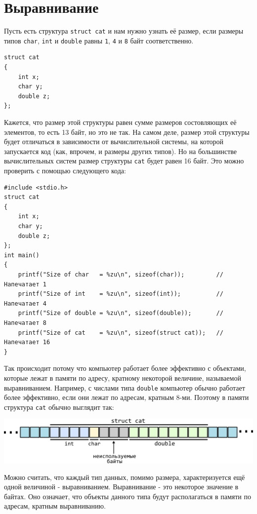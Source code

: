 \documentclass[10pt]{article}
\begin{document}
\newpage
\section*{Выравнивание}
Пусть есть структура \texttt{struct cat} и нам нужно узнать её размер, если размеры типов \texttt{char}, \texttt{int} и \texttt{double} равны \texttt{1}, \texttt{4} и \texttt{8} байт соответственно.
\begin{lstlisting}
struct cat 
{
    int x;
    char y;
    double z;
};
\end{lstlisting}
Кажется, что размер этой структуры равен сумме размеров состовляющих её элементов, то есть 13 байт, но это не так. На самом деле, размер этой структуры будет отличаться в зависимости от вычислительной системы, на которой запускается код (как, впрочем, и размеры других типов). Но на большинстве вычислительных систем размер структуры \texttt{cat} будет равен 16 байт. Это можно проверить с помощью следующего кода:
\begin{lstlisting}
#include <stdio.h>
struct cat 
{
    int x;
    char y;
    double z;
};
int main() 
{
    printf("Size of char   = %zu\n", sizeof(char));			// Напечатает 1
    printf("Size of int    = %zu\n", sizeof(int));			// Напечатает 4
    printf("Size of double = %zu\n", sizeof(double));		// Напечатает 8
    printf("Size of cat    = %zu\n", sizeof(struct cat));	// Напечатает 16
}
\end{lstlisting}
Так происходит потому что компьютер работает более эффективно с объектами, которые лежат в памяти по адресу, кратному некоторой величине, называемой выравниванием. Например, с числами типа \texttt{double} компьютер обычно работает более эффективно, если они лежат по адресам, кратным 8-ми. Поэтому в памяти структура \texttt{cat} обычно выглядит так: 

\begin{center}
\includegraphics[scale=1]{../images/alignment.png}
\end{center}
Можно считать, что каждый тип данных, помимо размера, характеризуется ещё одной величиной - выравниванием. Выравнивание - это некоторое значение в байтах. Оно означает, что объекты данного типа будут располагаться в памяти по адресам, кратным выравниванию.
\end{document}
